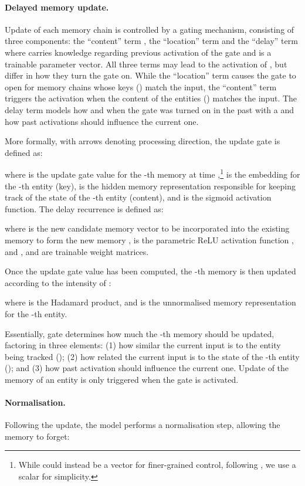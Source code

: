 \documentclass[11pt,a4paper]{article}
\begin{document}
\paragraph{Delayed memory update.} Update of each memory chain is controlled by a gating mechanism, consisting of three components: the ``content'' term  , the ``location'' term  and the ``delay'' term  where  carries knowledge regarding previous activation of the gate and  is a trainable parameter vector. All three terms may lead to the activation of , but differ in how they turn the gate on. While the ``location'' term causes the gate to open for memory chains whose keys () match the input, the ``content'' term triggers the activation when the content of the entities () matches the input. The delay term models how and when the gate was turned on in the past with a  \cite{Chung+:2014} and how past activations should influence the current one.

More formally, with arrows denoting processing direction, the update gate is defined as:

where  is the update gate value for the -th memory at time ,\footnote{While  could instead be a vector for finer-grained control, following , we use a scalar for simplicity.}  is the embedding for the -th entity (key),  is the hidden memory representation responsible for keeping track of the state of the -th entity (content), and  is the sigmoid activation function. The delay recurrence  is defined as: 

where  is the new candidate memory vector to be incorporated into the existing memory  to form the new memory ,  is the parametric ReLU activation function \cite{He+:2015}, and ,  and  are trainable weight matrices.

Once the update gate value has been computed, the -th memory is then updated according to the intensity of : 

where  is the Hadamard product, and  is the unnormalised memory representation for the -th entity.

Essentially, gate  determines how much the -th memory should be updated, factoring in three elements: (1) how similar the current input  is to the entity being tracked (); (2) how related the current input  is to the state of the -th entity (); and (3) how past activation should influence the current one. Update of the memory of an entity is only triggered when the gate is activated.

\paragraph{Normalisation.} Following the update, the model performs a normalisation step, allowing the memory to forget: 
\end{document}

